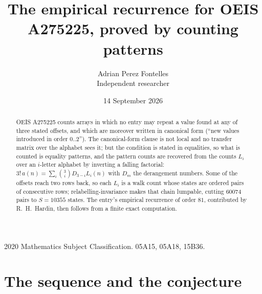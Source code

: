 \documentclass[11pt,a4paper]{article}
\title{The empirical recurrence for OEIS A275225, proved by counting patterns}
\author{Adrian Perez Fontelles\\ \small Independent researcher}
\date{14 September 2026}
\theoremstyle{plain}
\theoremstyle{definition}
\begin{document}
\maketitle

\begin{abstract}
OEIS A275225 counts arrays in which no entry may repeat a value found at any of three stated
offsets, and which are moreover written in canonical form (``new values introduced in order
$0..2$''). The canonical-form clause is not local and no transfer matrix over the
alphabet sees it; but the condition is stated in equalities, so what is counted is equality
patterns, and the pattern counts are recovered from the counts $L_i$ over an $i$-letter
alphabet by inverting a falling factorial:
$3!\,a(n)=\sum_i\binom{3}{i}D_{3-i}L_i(n)$ with $D_m$ the derangement numbers.
Some of the offsets reach two rows back, so each $L_i$ is a walk count whose states are
ordered pairs of consecutive rows; relabelling-invariance makes that chain lumpable,
cutting $60074$ pairs to $S=10355$ states. The entry's empirical recurrence of order $81$,
contributed by R.~H.~Hardin, then follows from a finite exact computation.
\end{abstract}

\noindent\small 2020 Mathematics Subject Classification. 05A15, 05A18, 15B36.\normalsize

\section{The sequence and the conjecture}
\end{document}
